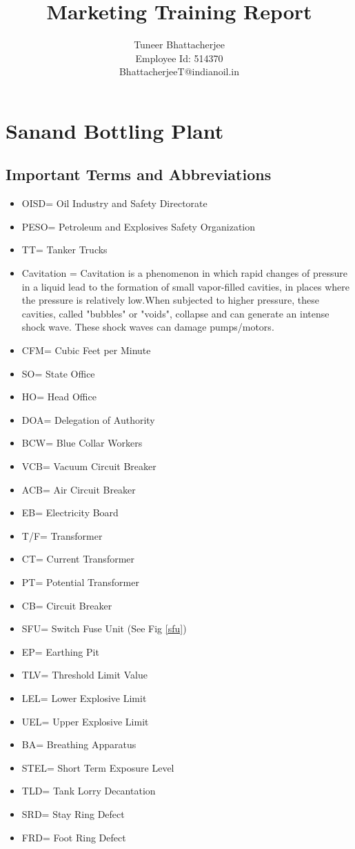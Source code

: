 \documentclass{report}
\title{Marketing Training Report}
\author{Tuneer Bhattacherjee\\Employee Id: 514370\\BhattacherjeeT@indianoil.in}
\date{}
\begin{document}
	\maketitle
	\pagebreak
	\tableofcontents
	\pagebreak
	\chapter{Sanand Bottling Plant}
	\section{Important Terms and Abbreviations}
	\begin{itemize}
		\item OISD= Oil Industry and Safety Directorate
		\item PESO= Petroleum and Explosives Safety Organization
		\item TT= Tanker Trucks
		\item Cavitation = Cavitation is a phenomenon in which rapid changes of pressure in a liquid lead to the formation of small vapor-filled cavities, in places where the pressure is relatively low.When subjected to higher pressure, these cavities, called "bubbles" or "voids", collapse and can generate an intense shock wave. These shock waves can damage pumps/motors.
		\item CFM= Cubic Feet per Minute
		\item SO= State Office
		\item HO= Head Office
		\item DOA= Delegation of Authority
		\item BCW= Blue Collar Workers
		\item VCB= Vacuum Circuit Breaker
		\item ACB= Air Circuit Breaker
		\item EB= Electricity Board
		\item T/F= Transformer
		\item CT= Current Transformer
		\item PT= Potential Transformer
		\item CB= Circuit Breaker
		\item SFU= Switch Fuse Unit (See Fig \ref{sfu})
		\item EP= Earthing Pit
		\item TLV= Threshold Limit Value
		\item LEL= Lower Explosive Limit
		\item UEL= Upper Explosive Limit
		\item BA= Breathing Apparatus
		\item STEL= Short Term Exposure Level
		\item TLD= Tank Lorry Decantation
		\item SRD= Stay Ring Defect
		\item FRD= Foot Ring Defect
	\end{itemize}
\end{document}
